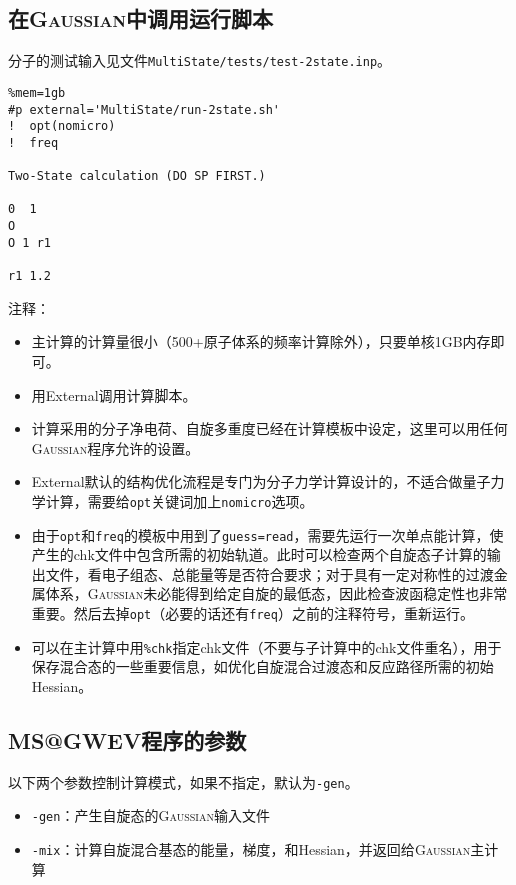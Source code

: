 \documentclass[UTF8]{ctexart}
\begin{document}
\subsection{在\textsc{Gaussian}中调用运行脚本}

分子的测试输入见文件\verb|MultiState/tests/test-2state.inp|。
\begin{lstlisting}[alsoletter={\%\#},morekeywords={\%nprocshared,\%mem,\#p,gb,external}]
%nprocshared=1
%mem=1gb
#p external='MultiState/run-2state.sh'
!  opt(nomicro)
!  freq

Two-State calculation (DO SP FIRST.)

0  1
O
O 1 r1

r1 1.2
\end{lstlisting}
注释：
\begin{itemize}
\item 主计算的计算量很小（500+原子体系的频率计算除外），只要单核1GB内存即可。
\item 用\textsf{External}调用计算脚本。
\item 计算采用的分子净电荷、自旋多重度已经在计算模板中设定，这里可以用任何\textsc{Gaussian}程序允许的设置。
\item \textsf{External}默认的结构优化流程是专门为分子力学计算设计的，不适合做量子力学计算，需要给\verb|opt|关键词加上\verb|nomicro|选项。
\item 由于\verb|opt|和\verb|freq|的模板中用到了\verb|guess=read|，需要先运行一次单点能计算，使产生的chk文件中包含所需的初始轨道。此时可以检查两个自旋态子计算的输出文件，看电子组态、总能量等是否符合要求；对于具有一定对称性的过渡金属体系，\textsc{Gaussian}未必能得到给定自旋的最低态，因此检查波函稳定性也非常重要。然后去掉\verb|opt|（必要的话还有\verb|freq|）之前的注释符号，重新运行。
\item 可以在主计算中用\verb|%chk|指定chk文件（不要与子计算中的chk文件重名），用于保存混合态的一些重要信息，如优化自旋混合过渡态和反应路径所需的初始Hessian。
\end{itemize}

\subsection{MS@GWEV程序的参数}

以下两个参数控制计算模式，如果不指定，默认为\verb|-gen|。
\begin{itemize}[leftmargin= 0 pt]
\item \verb|-gen|：产生自旋态的\textsc{Gaussian}输入文件
\item \verb|-mix|：计算自旋混合基态的能量，梯度，和Hessian，并返回给\textsc{Gaussian}主计算
\end{itemize}
\end{document}
